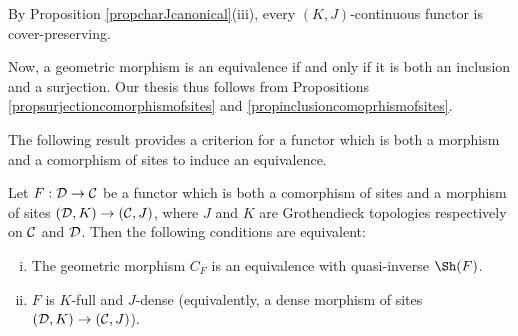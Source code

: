 \documentclass[a4paper,12pt]{article}
\begin{document}
\begin{proofs}
	By Proposition \ref{propcharJcanonical}(iii), every $(K, J)$-continuous functor is cover-preserving.
	
	Now, a geometric morphism is an equivalence if and only if it is both an inclusion and a surjection. Our thesis thus follows from Propositions \ref{propsurjectioncomorphismofsites} and \ref{propinclusioncomoprhismofsites}. 
\end{proofs}

The following result provides a criterion for a functor which is both a morphism and a comorphism of sites to induce an equivalence.

\begin{proposition}\label{propmorphismcomorphismequivalence}
	Let $F:{\cal D}\to {\cal C}$ be a functor which is both a comorphism of sites and a morphism of sites $({\cal D}, K)\to ({\cal C}, J)$, where $J$ and $K$ are Grothendieck topologies respectively on $\cal C$ and $\cal D$. Then the following conditions are equivalent:
	
	\begin{enumerate}[(i)]
		\item The geometric morphism $C_{F}$ is an equivalence with quasi-inverse $\Sh(F)$.
		
		\item $F$ is $K$-full and $J$-dense (equivalently, a dense morphism of sites $({\cal D}, K)\to ({\cal C}, J)$).
	\end{enumerate} 
\end{proposition}
\end{document}
